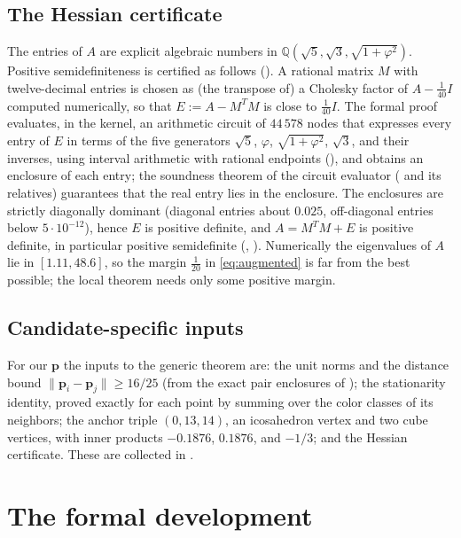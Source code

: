 \documentclass[11pt]{amsart}
\theoremstyle{definition}
\theoremstyle{remark}
\newcommand{\Q}{\mathbb{Q}}
\newcommand{\norm}[1]{\lVert #1\rVert}
\newcommand{\cand}{\mathbf{p}}
\begin{document}
\subsection{The Hessian certificate}\label{sec:hessiancert}

The entries of $A$ are explicit algebraic numbers in $\Q(\sqrt5,\sqrt3,\sqrt{1+\varphi^{2}})$. Positive semidefiniteness is certified as follows (). A rational matrix $M$ with twelve-decimal entries is chosen as (the transpose of) a Cholesky factor of $A-\frac{1}{40}I$ computed numerically, so that $E:=A-M^{T}M$ is close to $\frac{1}{40}I$. The formal proof evaluates, in the kernel, an arithmetic circuit of $44\,578$ nodes that expresses every entry of $E$ in terms of the five generators $\sqrt5$, $\varphi$, $\sqrt{1+\varphi^{2}}$, $\sqrt3$, and their inverses, using interval arithmetic with rational endpoints (), and obtains an enclosure of each entry; the soundness theorem of the circuit evaluator ( and its relatives) guarantees that the real entry lies in the enclosure. The enclosures are strictly diagonally dominant (diagonal entries about $0.025$, off-diagonal entries below $5\cdot10^{-12}$), hence $E$ is positive definite, and $A=M^{T}M+E$ is positive definite, in particular positive semidefinite (, ). Numerically the eigenvalues of $A$ lie in $[1.11,48.6]$, so the margin $\frac{1}{20}$ in \eqref{eq:augmented} is far from the best possible; the local theorem needs only some positive margin.

\subsection{Candidate-specific inputs}

For our $\cand$ the inputs to the generic theorem are: the unit norms and the distance bound $\norm{\cand_i-\cand_j}\ge16/25$ (from the exact pair enclosures of ); the stationarity identity, proved exactly for each point by summing over the color classes of its neighbors; the anchor triple $(0,13,14)$, an icosahedron vertex and two cube vertices, with inner products $-0.1876$, $0.1876$, and $-1/3$; and the Hessian certificate. These are collected in .

\section{The formal development}\label{sec:formal}
\end{document}
